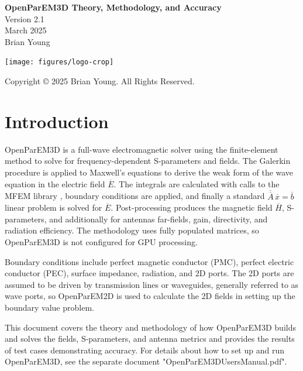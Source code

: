 \documentclass[titlepage]{article}
\renewcommand\_{\textunderscore\linebreak[1]}
\begin{document}
\begin{titlepage}

   \centering
   \vspace*{3cm}
   {\huge\bfseries OpenParEM3D Theory, Methodology, and Accuracy} \\
   \vskip1cm
   {\Large Version 2.1} \\
   \vskip1cm
   {\Large March 2025} \\
   \vskip1cm
   {\Large Brian Young} \\

   \vfill

   \texttt{[image: figures/logo-crop]}

   \vspace*{\fill}
   Copyright \copyright{} 2025 Brian Young. All Rights Reserved.
\end{titlepage}

\tableofcontents

\newpage
\section{Introduction}

OpenParEM3D is a full-wave electromagnetic solver using the finite-element method to solve for frequency-dependent S-parameters and fields.  The Galerkin procedure is applied to Maxwell's equations to derive the weak form of the wave equation in the electric field $\overline{E}$.  The integrals are calculated with calls to the MFEM library \cite{MFEM}\cite{MFEMweb}, boundary conditions are applied, and finally a standard $\overline{\overline{A}}\,\overline{x}=\overline{b}$ linear problem is solved for $\overline{E}$.  Post-processing produces the magnetic field $\overline{H}$, S-parameters, and additionally for antennas far-fields, gain, directivity, and radiation efficiency.  The methodology uses fully populated matrices, so OpenParEM3D is not configured for GPU processing.

Boundary conditions include perfect magnetic conductor (PMC), perfect electric conductor (PEC), surface impedance, radiation, and 2D ports.  The 2D ports are assumed to be driven by transmission lines or waveguides, generally referred to as wave ports, so OpenParEM2D is used to calculate the 2D fields in setting up the boundary value problem.

This document covers the theory and methodology of how OpenParEM3D builds and solves the fields, S-parameters, and antenna metrics and provides the results of test cases demonstrating accuracy.  For details about how to set up and run OpenParEM3D, see the separate document "OpenParEM3D\_Users\_Manual.pdf".
\end{document}
